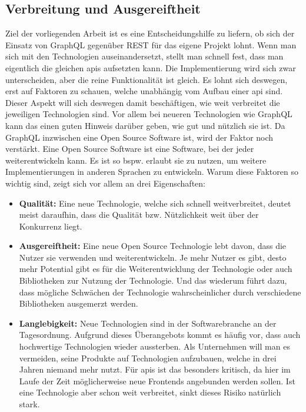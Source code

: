 \subsection{Verbreitung und Ausgereiftheit}

Ziel der vorliegenden Arbeit ist es eine Entscheidungshilfe zu liefern, ob sich der Einsatz von GraphQL gegenüber \ac{REST} für das eigene Projekt lohnt. Wenn man sich mit den Technologien auseinandersetzt, stellt man schnell fest, dass man eigentlich die gleichen \ac{api}s aufsetzten kann. Die Implementierung wird sich zwar unterscheiden, aber die reine Funktionalität ist gleich. Es lohnt sich deswegen, erst auf Faktoren zu schauen, welche unabhängig vom Aufbau einer \ac{api} sind. Dieser Aspekt will sich deswegen damit beschäftigen, wie weit verbreitet die jeweiligen Technologien sind. Vor allem bei neueren Technologien wie GraphQL kann das einen guten Hinweis darüber geben, wie gut und nützlich sie ist. Da GraphQL inzwischen eine Open Source Software ist, wird der Faktor noch verstärkt. Eine Open Source Software ist eine Software, bei der jeder weiterentwickeln kann. Es ist so bspw. erlaubt sie zu nutzen, um weitere Implementierungen in anderen Sprachen zu entwickeln. Warum diese Faktoren so wichtig sind, zeigt sich vor allem an drei Eigenschaften:

\begin{itemize}
\item \textbf{Qualität:} Eine neue Technologie, welche sich schnell weitverbreitet, deutet meist daraufhin, dass die Qualität bzw. Nützlichkeit weit über der Konkurrenz liegt.
\item \textbf{Ausgereiftheit:} Eine neue Open Source Technologie lebt davon, dass die Nutzer sie verwenden und weiterentwickeln. Je mehr Nutzer es gibt, desto mehr Potential gibt es für die Weiterentwicklung der Technologie oder auch Bibliotheken zur Nutzung der Technologie. Und das wiederum führt dazu, dass mögliche Schwächen der Technologie wahrscheinlicher durch verschiedene Bibliotheken ausgemerzt werden.
\item \textbf{Langlebigkeit:} Neue Technologien sind in der Softwarebranche an der Tagesordnung. Aufgrund dieses Überangebots kommt es häufig vor, dass auch hochwertige Technologien wieder aussterben. Als Unternehmen will man es vermeiden, seine Produkte auf Technologien aufzubauen, welche in drei Jahren niemand mehr nutzt. Für \ac{api}s ist das besonders kritisch, da hier im Laufe der Zeit möglicherweise neue Frontends angebunden werden sollen. Ist eine Technologie aber schon weit verbreitet, sinkt dieses Risiko natürlich stark.
\end{itemize}

